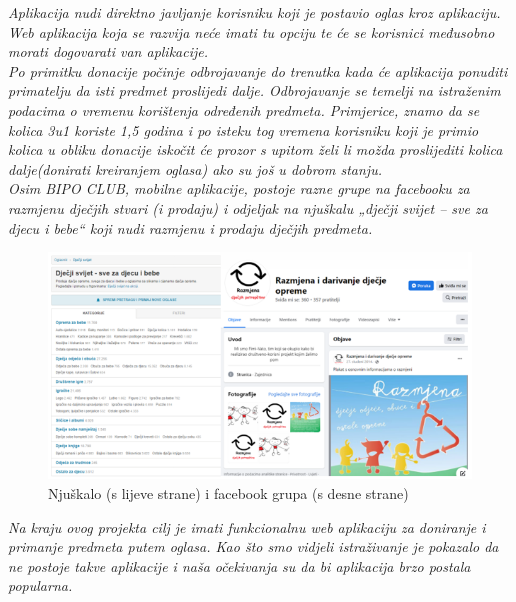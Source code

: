 		\newline
		\textit{Aplikacija nudi direktno javljanje korisniku koji je postavio oglas kroz aplikaciju. Web aplikacija koja se razvija neće imati tu opciju te će se korisnici međusobno morati dogovarati van aplikacije.}\\
		\newline
		\textit{Po primitku donacije počinje odbrojavanje do trenutka kada će aplikacija ponuditi primatelju da isti predmet proslijedi dalje. Odbrojavanje se temelji na istraženim podacima o vremenu korištenja određenih predmeta. Primjerice, znamo da se kolica 3u1 koriste 1,5 godina i po isteku tog vremena korisniku koji je primio kolica u obliku donacije iskočit će prozor s upitom želi li možda proslijediti kolica dalje(donirati kreiranjem oglasa) ako su još u dobrom stanju.  }\\
		\newline
		\textit{Osim BIPO CLUB, mobilne aplikacije, postoje razne grupe na facebooku za razmjenu dječjih stvari (i prodaju) i odjeljak na njuškalu  „dječji svijet – sve za djecu i bebe“ koji nudi razmjenu i prodaju dječjih predmeta. }\\
		\newline
		\begin{figure}[h!]
			\center
			\includegraphics[width = \linewidth]{Picture6.png}
			\caption{Njuškalo (s lijeve strane) i facebook grupa (s desne strane)}
			\label{fig6}
		\end{figure}
		\newline
		\textit{Na kraju ovog projekta cilj je imati funkcionalnu web aplikaciju za doniranje i primanje predmeta putem oglasa. Kao što smo vidjeli istraživanje je pokazalo da ne postoje takve aplikacije i naša očekivanja su da bi aplikacija brzo postala popularna. }\\
		\newline
